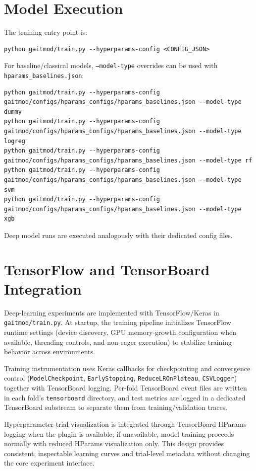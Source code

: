 \section{Model Execution}
\label{sec:reproducibility_model_execution}
The training entry point is:
\begin{verbatim}
python gaitmod/train.py --hyperparams-config <CONFIG_JSON>
\end{verbatim}
For baseline/classical models, \texttt{--model-type} overrides can be used with \texttt{hparams\_baselines.json}:
\begin{verbatim}
python gaitmod/train.py --hyperparams-config gaitmod/configs/hparams_configs/hparams_baselines.json --model-type dummy
python gaitmod/train.py --hyperparams-config gaitmod/configs/hparams_configs/hparams_baselines.json --model-type logreg
python gaitmod/train.py --hyperparams-config gaitmod/configs/hparams_configs/hparams_baselines.json --model-type rf
python gaitmod/train.py --hyperparams-config gaitmod/configs/hparams_configs/hparams_baselines.json --model-type svm
python gaitmod/train.py --hyperparams-config gaitmod/configs/hparams_configs/hparams_baselines.json --model-type xgb
\end{verbatim}
Deep model runs are executed analogously with their dedicated config files.

\section{TensorFlow and TensorBoard Integration}
\label{sec:reproducibility_tf_tensorboard}
Deep-learning experiments are implemented with TensorFlow/Keras in \texttt{gaitmod/train.py}. At startup, the training pipeline initializes TensorFlow runtime settings (device discovery, GPU memory-growth configuration when available, threading controls, and non-eager execution) to stabilize training behavior across environments.

Training instrumentation uses Keras callbacks for checkpointing and convergence control (\texttt{ModelCheckpoint}, \texttt{EarlyStopping}, \texttt{ReduceLROnPlateau}, \texttt{CSVLogger}) together with TensorBoard logging. Per-fold TensorBoard event files are written in each fold's \texttt{tensorboard} directory, and test metrics are logged in a dedicated TensorBoard substream to separate them from training/validation traces.

Hyperparameter-trial visualization is integrated through TensorBoard HParams logging when the plugin is available; if unavailable, model training proceeds normally with reduced HParams visualization only. This design provides consistent, inspectable learning curves and trial-level metadata without changing the core experiment interface.

